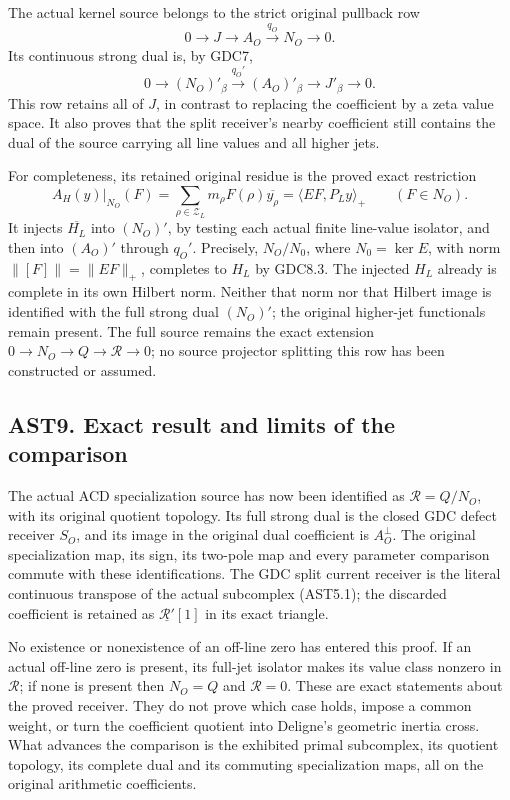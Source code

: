 The actual kernel source belongs to the strict original pullback row \[
0\to J\to A_O\xrightarrow{q_O}N_O\to0.
\tag{AST8.1}
\] Its continuous strong dual is, by GDC7, \[
0\to(N_O)'_\beta\xrightarrow{q_O'}(A_O)'_\beta
\to J'_\beta\to0.
\tag{AST8.2}
\] This row retains all of \(J\), in contrast to replacing the
coefficient by a zeta value space. It also proves that the split
receiver's nearby coefficient still contains the dual of the source
carrying all line values and all higher jets.

For completeness, its retained original residue is the proved exact
restriction \[
A_H(y)|_{N_O}(F)
=\sum_{\rho\in\mathscr Z_L}m_\rho F(\rho)\overline{y_\rho}
=\langle EF,P_Ly\rangle_+\qquad(F\in N_O).
\tag{AST8.3}
\] It injects \(\overline{H_L}\) into \((N_O)'\), by testing each actual
finite line-value isolator, and then into \((A_O)'\) through \(q_O'\).
Precisely, \(N_O/N_0\), where \(N_0=\ker E\), with norm
\(\|[F]\|=\|EF\|_+\), completes to \(H_L\) by GDC8.3. The injected
\(H_L\) already is complete in its own Hilbert norm. Neither that norm
nor that Hilbert image is identified with the full strong dual
\((N_O)'\); the original higher-jet functionals remain present. The full
source remains the exact extension \(0\to N_O\to Q\to\mathcal R\to0\);
no source projector splitting this row has been constructed or assumed.

\subsection{AST9. Exact result and limits of the
comparison}\label{ast9.-exact-result-and-limits-of-the-comparison}

The actual ACD specialization source has now been identified as
\(\mathcal R=Q/N_O\), with its original quotient topology. Its full
strong dual is the closed GDC defect receiver \(S_O\), and its image in
the original dual coefficient is \(A_O^\perp\). The original
specialization map, its sign, its two-pole map and every parameter
comparison commute with these identifications. The GDC split current
receiver is the literal continuous transpose of the actual subcomplex
(AST5.1); the discarded coefficient is retained as
\(\underline{\mathcal R'}[1]\) in its exact triangle.

No existence or nonexistence of an off-line zero has entered this proof.
If an actual off-line zero is present, its full-jet isolator makes its
value class nonzero in \(\mathcal R\); if none is present then \(N_O=Q\)
and \(\mathcal R=0\). These are exact statements about the proved
receiver. They do not prove which case holds, impose a common weight, or
turn the coefficient quotient into Deligne's geometric inertia cross.
What advances the comparison is the exhibited primal subcomplex, its
quotient topology, its complete dual and its commuting specialization
maps, all on the original arithmetic coefficients.
